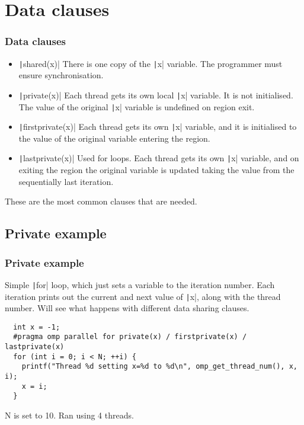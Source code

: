 \documentclass{beamer}
\begin{document}
\section{Data clauses}
\begin{frame}
\frametitle{Data clauses}
\begin{itemize}
  \item \texttt|shared(x)|
    There is one copy of the \texttt|x| variable. The programmer must ensure synchronisation.
  \item \texttt|private(x)|
    Each thread gets its own local \texttt|x| variable. It is not initialised. The value of the original \texttt|x| variable is undefined on region exit.
  \item \texttt|firstprivate(x)|
    Each thread gets its own \texttt|x| variable, and it is initialised to the value of the original variable entering the region.
  \item \texttt|lastprivate(x)|
    Used for loops. Each thread gets its own \texttt|x| variable, and on exiting the region the original variable is updated taking the value from the sequentially last iteration.
\end{itemize}

These are the most common clauses that are needed.
\end{frame}

\subsection{Private example}
\begin{frame}[fragile]
\frametitle{Private example}
Simple \texttt|for| loop, which just sets a variable to the iteration number.
Each iteration prints out the current and next value of \texttt|x|, along with the thread number.
Will see what happens with different data sharing clauses.

\begin{verbatim}
  int x = -1;
  #pragma omp parallel for private(x) / firstprivate(x) / lastprivate(x)
  for (int i = 0; i < N; ++i) {
    printf("Thread %d setting x=%d to %d\n", omp_get_thread_num(), x, i);
    x = i;
  }
\end{verbatim}
N is set to 10.
Ran using 4 threads.
\end{frame}
\end{document}
